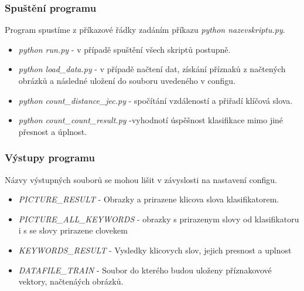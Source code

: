 \documentclass[czech,BP]{thesiskiv}
\begin{document}
\subsubsection{Spuštění programu}
Program spustíme z příkazové řádky zadáním příkazu \textit{python nazevskriptu.py}. 
\begin{itemize}
	\item \textit{python run.py} - v případě spuštění všech skriptů postupně.
	\item \textit{python load\_data.py} - v případě načtení dat, získání příznaků z načtených obrázků a následné uložení do souboru uvedeného v configu.
	\item \textit{python count\_distance\_jec.py} - spočítání vzdáleností a přiřadí klíčová slova.
	\item \textit{python count\_count\_result.py} -vyhodnotí úspěšnost klasifikace mimo jiné přesnost a úplnost.
\end{itemize}

\subsubsection{Výstupy programu}
Názvy výstupných souborů se mohou lišit v závyslosti na nastavení configu.
\begin{itemize}
	\item \textit{PICTURE\_RESULT} - Obrazky a prirazene klicova slova klasifikatorem.
	\item \textit{PICTURE\_ALL\_KEYWORDS} - obrazky s prirazenym slovy od klasifikatoru i s se slovy prirazene clovekem
	\item \textit{KEYWORDS\_RESULT} - Vysledky klicovych slov, jejich presnost a uplnost
	\item \textit{DATAFILE\_TRAIN} - Soubor do kterého budou uloženy příznakovové vektory, načtenáých obrázků. 
\end{itemize}
	
\end{document}

